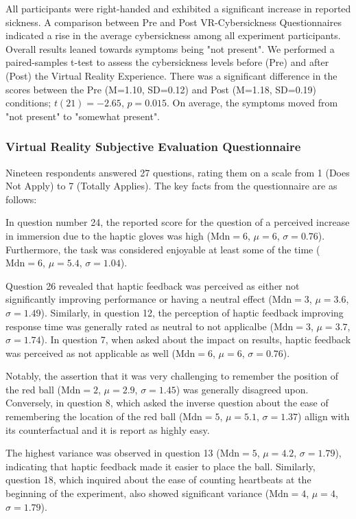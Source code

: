 \documentclass[12pt,oneside,openright]{report}
\begin{document}
All participants were right-handed and exhibited a significant increase in reported sickness. A comparison between Pre and Post VR-Cybersickness Questionnaires indicated a rise in the average cybersickness among all experiment participants. Overall results leaned towards symptoms being "not present". We performed a paired-samples t-test to assess the cybersickness levels before (Pre) and after (Post) the Virtual Reality Experience. There was a significant difference in the scores between the Pre (M=1.10, SD=0.12) and Post (M=1.18, SD=0.19) conditions; $t(21)=-2.65$, $p = 0.015$. On average, the symptoms moved from "not present" to "somewhat present". 

\subsubsection*{Virtual Reality Subjective Evaluation Questionnaire}
Nineteen respondents answered 27 questions, rating them on a scale from 1 (Does Not Apply) to 7 (Totally Applies). The key facts from the questionnaire are as follows:
    
In question number 24, the reported score for the question of a perceived increase in immersion due to the haptic gloves was high ($\text{Mdn} = 6$, $\mu = 6$, $\sigma = 0.76$). Furthermore, the task was considered enjoyable at least some of the time ($\text{Mdn} = 6$, $\mu = 5.4$, $\sigma = 1.04$).
        
Question 26 revealed that haptic feedback was perceived as either not significantly improving performance or having a neutral effect ($\text{Mdn} = 3$, $\mu = 3.6$, $\sigma = 1.49$). Similarly, in question 12, the perception of haptic feedback improving response time was generally rated as neutral to not applicalbe ($\text{Mdn} = 3$, $\mu = 3.7$, $\sigma = 1.74$). In question 7, when asked about the impact on results, haptic feedback was perceived as not applicable as well ($\text{Mdn} = 6$, $\mu = 6$, $\sigma = 0.76$).
    
Notably, the assertion that it was very challenging to remember the position of the red ball ($\text{Mdn} = 2$, $\mu = 2.9$, $\sigma = 1.45$) was generally disagreed upon. Conversely, in question 8, which asked the inverse question about the ease of remembering the location of the red ball ($\text{Mdn} = 5$, $\mu = 5.1$, $\sigma = 1.37$) allign with its counterfactual and it is report as highly easy. 
    
The highest variance was observed in question 13 ($\text{Mdn} = 5$, $\mu = 4.2$, $\sigma = 1.79$), indicating that haptic feedback made it easier to place the ball. Similarly, question 18, which inquired about the ease of counting heartbeats at the beginning of the experiment, also showed significant variance ($\text{Mdn} = 4$, $\mu = 4$, $\sigma = 1.79$). 
    
\end{document}
